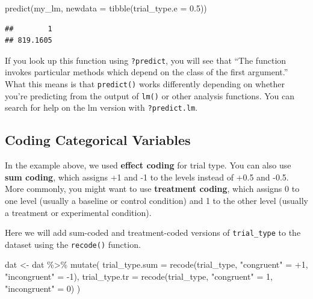 \documentclass[
  oneside]{book}
\newenvironment{Shaded}{\begin{snugshade}}{\end{snugshade}}
\newcommand{\AttributeTok}[1]{\textcolor[rgb]{0.77,0.63,0.00}{#1}}
\newcommand{\DecValTok}[1]{\textcolor[rgb]{0.00,0.00,0.81}{#1}}
\newcommand{\FloatTok}[1]{\textcolor[rgb]{0.00,0.00,0.81}{#1}}
\newcommand{\FunctionTok}[1]{\textcolor[rgb]{0.00,0.00,0.00}{#1}}
\newcommand{\NormalTok}[1]{#1}
\newcommand{\OtherTok}[1]{\textcolor[rgb]{0.56,0.35,0.01}{#1}}
\newcommand{\SpecialCharTok}[1]{\textcolor[rgb]{0.00,0.00,0.00}{#1}}
\newcommand{\StringTok}[1]{\textcolor[rgb]{0.31,0.60,0.02}{#1}}
\begin{document}
\begin{Shaded}
\begin{Highlighting}[]
\FunctionTok{predict}\NormalTok{(my\_lm, }\AttributeTok{newdata =} \FunctionTok{tibble}\NormalTok{(}\AttributeTok{trial\_type.e =} \FloatTok{0.5}\NormalTok{))}
\end{Highlighting}
\end{Shaded}

\begin{verbatim}
##        1 
## 819.1605
\end{verbatim}

\begin{info}
If you look up this function using \texttt{?predict}, you will see that ``The function invokes particular methods which depend on the class of the first argument.''
What this means is that \texttt{predict()} works differently depending on whether you're predicting from the output of \texttt{lm()} or other analysis functions. You can search for help on the lm version with \texttt{?predict.lm}.

\end{info}

\hypertarget{coding-schemes}{%
\subsection{Coding Categorical Variables}\label{coding-schemes}}

In the example above, we used \textbf{effect coding} for trial type. You can also use \textbf{sum coding}, which assigns +1 and -1 to the levels instead of +0.5 and -0.5. More commonly, you might want to use \textbf{treatment coding}, which assigns 0 to one level (usually a baseline or control condition) and 1 to the other level (usually a treatment or experimental condition).

Here we will add sum-coded and treatment-coded versions of \texttt{trial\_type} to the dataset using the \texttt{recode()} function.

\begin{Shaded}
\begin{Highlighting}[]
\NormalTok{dat }\OtherTok{\textless{}{-}}\NormalTok{ dat }\SpecialCharTok{\%\textgreater{}\%} \FunctionTok{mutate}\NormalTok{(}
  \AttributeTok{trial\_type.sum =} \FunctionTok{recode}\NormalTok{(trial\_type, }\StringTok{"congruent"} \OtherTok{=} \SpecialCharTok{+}\DecValTok{1}\NormalTok{, }\StringTok{"incongruent"} \OtherTok{=} \SpecialCharTok{{-}}\DecValTok{1}\NormalTok{),}
  \AttributeTok{trial\_type.tr =} \FunctionTok{recode}\NormalTok{(trial\_type, }\StringTok{"congruent"} \OtherTok{=} \DecValTok{1}\NormalTok{, }\StringTok{"incongruent"} \OtherTok{=} \DecValTok{0}\NormalTok{)}
\NormalTok{)}
\end{Highlighting}
\end{Shaded}
\end{document}
